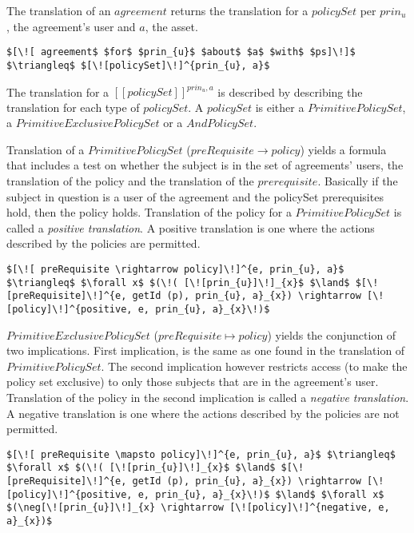 The translation of an $agreement$ returns the translation for a $policySet$ per $prin_{u}$, the agreement's user and $a$, the asset.


\lstset{mathescape, language=AST}  
\begin{lstlisting}[frame=single, caption={Agreement Translation},label={lst:transAgreementast}]
$[\![ agreement$ $for$ $prin_{u}$ $about$ $a$ $with$ $ps]\!]$ $\triangleq$ $[\![policySet]\!]^{prin_{u}, a}$
\end{lstlisting}

The translation for a $[\![policySet]\!]^{prin_{u}, a}$ is described by describing the translation for each type of $policySet$. A $policySet$ is either a $PrimitivePolicySet$, a $PrimitiveExclusivePolicySet$ or a $AndPolicySet$.


Translation of a $PrimitivePolicySet$ ($preRequisite \rightarrow policy$) yields a formula that includes a test on whether the subject is in the set of agreements' users, the translation of the policy and the translation of the $prerequisite$. Basically if the subject in question is a user of the agreement and the policySet prerequisites hold, then the policy holds. Translation of the policy for a $PrimitivePolicySet$ is called a \emph{positive translation}. A positive translation is one where the actions described by the policies are permitted.   

\lstset{mathescape, language=AST}  
\begin{lstlisting}[frame=single, caption={Policy Set Translation {$\colon$} PrimitivePolicySet},label={lst:transpolicyformulaPrimitivePolicySet}]
$[\![ preRequisite \rightarrow policy]\!]^{e, prin_{u}, a}$ $\triangleq$ $\forall x$ $(\!( [\![prin_{u}]\!]_{x}$ $\land$ $[\![preRequisite]\!]^{e, getId (p), prin_{u}, a}_{x}) \rightarrow [\![policy]\!]^{positive, e, prin_{u}, a}_{x}\!)$
\end{lstlisting}

$PrimitiveExclusivePolicySet$ ($preRequisite \mapsto policy$) yields the conjunction of two implications. First implication, is the same as one found in the translation of $PrimitivePolicySet$. The second implication however restricts access (to make the policy set exclusive) to only those subjects that are in the agreement's user. Translation of the policy in the second implication is called a \emph{negative translation}. A negative translation is one where the actions described by the policies are not permitted. 


\lstset{mathescape, language=AST}  
\begin{lstlisting}[frame=single, caption={Policy Set Translation {$\colon$} PrimitiveExclusivePolicySet},label={lst:transpolicyformulaPrimitiveExclusivePolicySet}]
$[\![ preRequisite \mapsto policy]\!]^{e, prin_{u}, a}$ $\triangleq$ $\forall x$ $(\!( [\![prin_{u}]\!]_{x}$ $\land$ $[\![preRequisite]\!]^{e, getId (p), prin_{u}, a}_{x}) \rightarrow [\![policy]\!]^{positive, e, prin_{u}, a}_{x}\!)$ $\land$ $\forall x$ $(\neg[\![prin_{u}]\!]_{x} \rightarrow [\![policy]\!]^{negative, e, a}_{x})$
\end{lstlisting}

